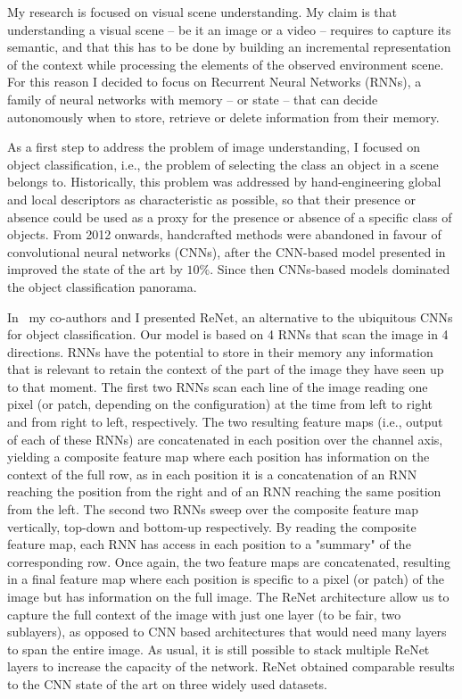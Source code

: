 My research is focused on visual scene understanding. My claim is that
understanding a visual scene -- be it an image or a video -- requires to capture
its semantic, and that this has to be done by building an incremental
representation of the context while processing the elements of the observed environment scene. For
this reason I decided to focus on Recurrent Neural Networks (RNNs), a family
of neural networks with memory -- or state -- that can decide autonomously when
to store, retrieve or delete information from their memory.

As a first step to address the problem of image understanding, I focused on
object classification, i.e., the problem of selecting the class an object in a
scene belongs to. Historically, this problem was addressed by hand-engineering
global and local descriptors as characteristic as possible, so that their
presence or absence could be used as a proxy for the presence or absence of a
specific class of objects. From 2012 onwards, handcrafted methods were
abandoned in favour of convolutional neural networks (CNNs), after the
CNN-based model presented in~\cite{Krizhevsky-2012} improved the state of the
art by $10\%$. Since then CNNs-based models dominated the object classification
panorama.

In~\cite{visin2015renet} my co-authors and I presented ReNet, an alternative to
the ubiquitous CNNs for object classification. Our model is based on 4 RNNs
that scan the image in 4 directions. RNNs have the potential to store in their
memory any information that is relevant to retain the context of the part of
the image they have seen up to that moment. The first two RNNs scan each line
of the image reading one pixel (or patch, depending on the configuration) at
the time from left to right and from right to left, respectively. The two
resulting feature maps (i.e., output of each of these RNNs) are concatenated in
each position over the channel axis, yielding a composite feature map where
each position has information on the context of the full row, as in each
position it is a concatenation of an RNN reaching the position from the right
and of an RNN reaching the same position from the left. The second two RNNs
sweep over the composite feature map vertically, top-down and bottom-up
respectively. By reading the composite feature map, each RNN has access in each
position to a "summary" of the corresponding row. Once again, the two feature
maps are concatenated, resulting in a final feature map where each position is
specific to a pixel (or patch) of the image but has information on the full
image. The ReNet architecture allow us to capture the full context of the image
with just one layer (to be fair, two sublayers), as opposed to CNN based
architectures that would need many layers to span the entire image. As usual,
it is still possible to stack multiple ReNet layers to increase the capacity of
the network. ReNet obtained comparable results to the CNN state of the art on
three widely used datasets.

